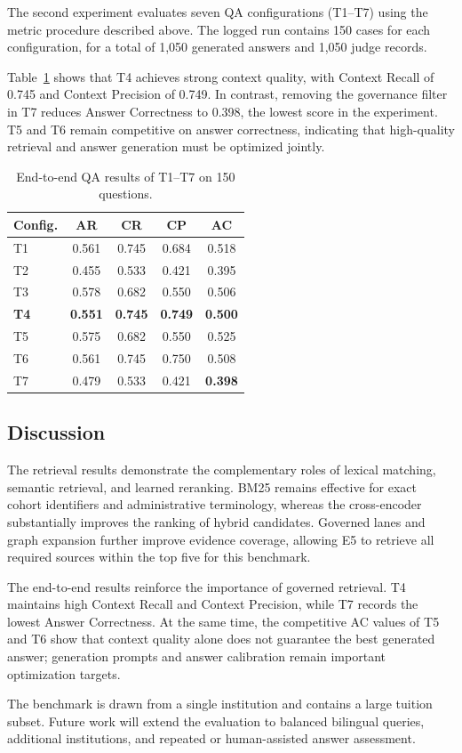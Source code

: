 The second experiment evaluates seven QA configurations (T1--T7) using the
metric procedure described above. The logged run contains 150 cases for each
configuration, for a total of 1,050 generated answers and 1,050 judge records.

Table~\ref{tab:ragas} shows that T4 achieves strong context quality, with
Context Recall of 0.745 and Context Precision of 0.749. In contrast, removing
the governance filter in T7 reduces Answer Correctness to 0.398, the lowest
score in the experiment. T5 and T6 remain competitive on answer correctness,
indicating that high-quality retrieval and answer generation must be optimized
jointly.

\begin{table}[!ht]
\centering
\caption{End-to-end QA results of T1--T7 on 150 questions.}
\label{tab:ragas}
\begin{tabular}{lcccc}
\toprule
Config. & AR & CR & CP & AC \\
\midrule
T1 & 0.561 & 0.745 & 0.684 & 0.518 \\
T2 & 0.455 & 0.533 & 0.421 & 0.395 \\
T3 & 0.578 & 0.682 & 0.550 & 0.506 \\
\textbf{T4} & \textbf{0.551} & \textbf{0.745} & \textbf{0.749} & \textbf{0.500} \\
T5 & 0.575 & 0.682 & 0.550 & 0.525 \\
T6 & 0.561 & 0.745 & 0.750 & 0.508 \\
T7 & 0.479 & 0.533 & 0.421 & \textbf{0.398} \\
\bottomrule
\end{tabular}
\end{table}

\subsection{Discussion}

The retrieval results demonstrate the complementary roles of lexical matching,
semantic retrieval, and learned reranking. BM25 remains effective for exact
cohort identifiers and administrative terminology, whereas the cross-encoder
substantially improves the ranking of hybrid candidates. Governed lanes and
graph expansion further improve evidence coverage, allowing E5 to retrieve all
required sources within the top five for this benchmark.

The end-to-end results reinforce the importance of governed retrieval. T4
maintains high Context Recall and Context Precision, while T7 records the
lowest Answer Correctness. At the same time, the competitive AC values of T5
and T6 show that context quality alone does not guarantee the best generated
answer; generation prompts and answer calibration remain important optimization
targets.

The benchmark is drawn from a single institution and contains a large tuition
subset. Future work will extend the evaluation to balanced bilingual queries,
additional institutions, and repeated or human-assisted answer assessment.
